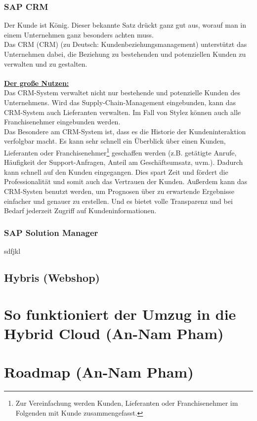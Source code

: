 \subsubsection{SAP CRM}
\glqq Der Kunde ist König\grqq. Dieser bekannte Satz drückt ganz gut aus, worauf man in einem Unternehmen ganz besonders achten muss.\\
Das \acrlong{CRM} (CRM) (zu Deutsch: Kundenbeziehungsmanagement) unterstützt das Unternehmen dabei, die Beziehung zu bestehenden und potenziellen Kunden zu verwalten und zu gestalten.\\
\\
\underline{\textbf{Der große Nutzen:}}\\
Das CRM-System verwaltet nicht nur bestehende und potenzielle Kunden des Unternehmens. Wird das Supply-Chain-Management eingebunden, kann das CRM-System auch Lieferanten verwalten. Im Fall von Stylez können auch alle Franchisenehmer eingebunden werden.\\
Das Besondere am CRM-System ist, dass es die Historie der Kundeninteraktion verfolgbar macht. Es kann sehr schnell ein Überblick über einen Kunden, Lieferanten oder Franchisenehmer\footnote{Zur Vereinfachung werden Kunden, Lieferanten oder Franchisenehmer im Folgenden mit Kunde zusammengefasst.} geschaffen werden (z.B. getätigte Anrufe, Häufigkeit der Support-Anfragen, Anteil am Geschäftsumsatz, uvm.).
Dadurch kann schnell auf den Kunden eingegangen. Dies spart Zeit und fördert die Professionalität und somit auch das Vertrauen der Kunden. Außerdem kann das CRM-Systen benutzt werden, um Prognosen über zu erwartende Ergebnisse einfacher und genauer zu erstellen. Und es bietet volle Transparenz und bei Bedarf jederzeit Zugriff auf Kundeninformationen.

\subsubsection{SAP Solution Manager}
sdfjkl
\subsection{Hybris (Webshop)}
\section{So funktioniert der Umzug in die Hybrid Cloud (An-Nam Pham)}
\section{Roadmap (An-Nam Pham)}
